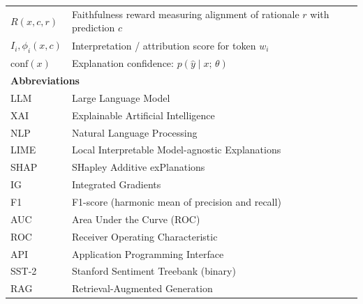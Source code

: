 \begin{longtable}{p{2.8cm} p{9.2cm}}
$R(x, c, r)$               & Faithfulness reward measuring alignment of rationale $r$ with prediction $c$ \\
$I_i, \phi_i(x, c)$        & Interpretation / attribution score for token $w_i$ \\
$\text{conf}(x)$           & Explanation confidence: $p(\hat{y} \mid x;\, \theta)$ \\
\midrule
\multicolumn{2}{l}{\textbf{Abbreviations}} \\
\midrule
LLM                        & Large Language Model \\
XAI                        & Explainable Artificial Intelligence \\
NLP                        & Natural Language Processing \\
LIME                       & Local Interpretable Model-agnostic Explanations \\
SHAP                       & SHapley Additive exPlanations \\
IG                         & Integrated Gradients \\
F1                         & F1-score (harmonic mean of precision and recall) \\
AUC                        & Area Under the Curve (ROC) \\
ROC                        & Receiver Operating Characteristic \\
API                        & Application Programming Interface \\
SST-2                      & Stanford Sentiment Treebank (binary) \\
RAG                        & Retrieval-Augmented Generation \\
\end{longtable}
